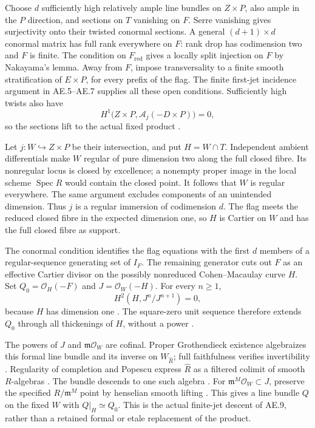 Choose $d$ sufficiently high relatively ample line bundles on
$Z\times P$, also ample in the $P$ direction, and sections on $T$
vanishing on $F$.  Serre vanishing gives surjectivity onto their
twisted conormal sections.  A general $(d+1)\times d$ conormal
matrix has full rank everywhere on $F$: rank drop has codimension
two and $F$ is finite.  The condition on $F_{\mathrm{red}}$ gives
a locally split injection on $F$ by Nakayama's lemma.
Away from $F$, impose transversality to a finite smooth stratification
of $E\times P$, for every prefix of the flag.  The finite first-jet
incidence argument in AE.5--AE.7 supplies all these open conditions.
Sufficiently high twists also have
\[
 H^1\bigl(Z\times P,\mathcal A_j(-D\times P)\bigr)=0,
\]
so the sections lift to the actual fixed product
\citep[Lemma 30.17.1]{frC3azStacksSerre}.

Let $j:W\hookrightarrow Z\times P$ be their intersection, and put
$H=W\cap T$.  Independent ambient differentials make $W$ regular
of pure dimension two along the full closed fibre.  Its nonregular
locus is closed by excellence; a nonempty proper image in the local
scheme $\operatorname{Spec}R$ would contain the closed point.
It follows that $W$ is regular everywhere.  The same argument
excludes components of an unintended dimension.  Thus $j$ is a
regular immersion of codimension $d$.  The flag meets the reduced
closed fibre in the expected dimension one, so $H$ is Cartier on
$W$ and has the full closed fibre as support.

The conormal condition identifies the flag equations with the
first $d$ members of a regular-sequence generating set of $I_F$.
The remaining generator cuts out $F$ as an effective Cartier divisor
on the possibly nonreduced Cohen--Macaulay curve $H$.
Set $Q_0=\mathcal O_H(-F)$ and $J=\mathcal O_W(-H)$.
For every $n\geq1$,
\[
                 H^2(H,J^n/J^{n+1})=0,
\]
because $H$ has dimension one
\citep[Proposition 20.20.7]{frWPStacksDimensionVanishing}.
The square-zero unit sequence therefore extends $Q_0$ through all
thickenings of $H$, without a power
\citep[Lemma 37.4.1]{frC3azStacksPicThickening}.

The powers of $J$ and $\mathfrak m\mathcal O_W$ are cofinal.
Proper Grothendieck existence algebraizes this formal line bundle
and its inverse on $W_{\widehat R}$; full faithfulness verifies
invertibility \citep[Lemma 30.24.3]{frC3azStacksExistence}.
Regularity of completion and Popescu express $\widehat R$ as a
filtered colimit of smooth $R$-algebras
\citep[Lemma 15.51.14; Theorem 16.12.1]
{frC3azStacksCompletion,frC3azStacksPopescu}.
The bundle descends to one such algebra
\citep[Lemma 32.10.3(2)]{frC3azStacksLimitBundles}.
For $\mathfrak m^M\mathcal O_W\subset J$, preserve the specified
$R/\mathfrak m^M$ point by henselian smooth lifting
\citep[Lemma 15.13.3]{frC3azStacksHenselSmooth}.
This gives a line bundle $Q$ on the fixed $W$ with $Q|_H\simeq Q_0$.
This is the actual finite-jet descent of AE.9, rather than a
retained formal or etale replacement of the product.

